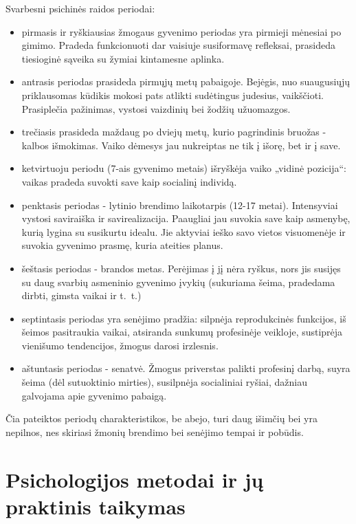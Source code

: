 Svarbesni psichinės raidos periodai:
\begin{itemize}
  \item pirmasis ir ryškiausias žmogaus gyvenimo periodas yra pirmieji 
  mėnesiai po gimimo. Pradeda funkcionuoti dar vaisiuje susiformavę 
  refleksai, prasideda tiesioginė sąveika su žymiai kintamesne aplinka.
  \item antrasis periodas prasideda pirmųjų metų pabaigoje. Bejėgis, nuo
  suaugusiųjų priklausomas kūdikis mokosi pats atlikti sudėtingus judesius,
  vaikščioti. Prasiplečia pažinimas, vystosi vaizdinių bei žodžių užuomazgos.
  \item trečiasis prasideda maždaug po dviejų metų, kurio pagrindinis 
  bruožas - kalbos išmokimas. Vaiko dėmesys jau nukreiptas ne tik į išorę,
  bet ir į save.
  \item ketvirtuoju periodu (7-ais gyvenimo metais) išryškėja vaiko „vidinė
  pozicija“: vaikas pradeda suvokti save kaip socialinį individą.
  \item penktasis periodas - lytinio brendimo laikotarpis (12-17 metai).
  Intensyviai vystosi saviraiška ir savirealizacija. Paaugliai jau suvokia 
  save kaip asmenybę, kurią lygina su susikurtu idealu. Jie aktyviai
  ieško savo vietos visuomenėje ir suvokia gyvenimo prasmę, kuria ateities
  planus.
  \item šeštasis periodas - brandos metas. Perėjimas į jį nėra ryškus, nors 
  jis susijęs su daug svarbių asmeninio gyvenimo įvykių (sukuriama šeima,
  pradedama dirbti, gimsta vaikai ir t.~t.)
  \item septintasis periodas yra senėjimo pradžia: silpnėja reprodukcinės 
  funkcijos, iš šeimos pasitraukia vaikai, atsiranda sunkumų profesinėje 
  veikloje, sustiprėja vienišumo tendencijos, žmogus darosi irzlesnis.
  \item aštuntasis periodas - senatvė. Žmogus priverstas palikti profesinį
  darbą, suyra šeima (dėl sutuoktinio mirties), susilpnėja socialiniai ryšiai,
  dažniau galvojama apie gyvenimo pabaigą.
\end{itemize}

Čia pateiktos periodų charakteristikos, be abejo, turi daug išimčių bei yra 
nepilnos, nes skiriasi žmonių brendimo bei senėjimo tempai ir pobūdis.

\section{Psichologijos metodai ir jų praktinis taikymas}

